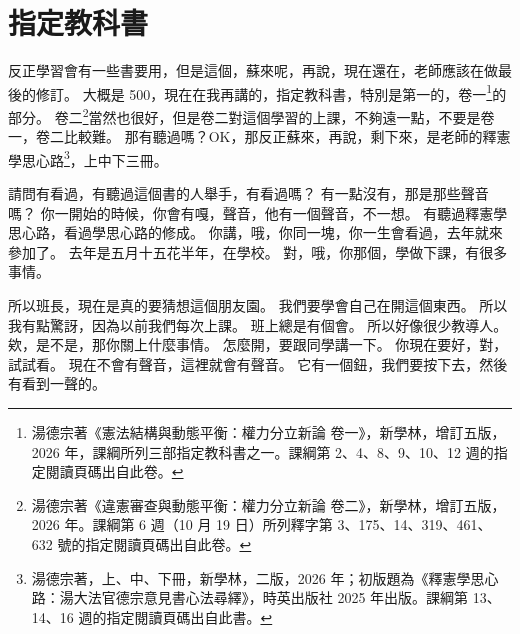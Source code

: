 \section{指定教科書}

\hypertarget{c01:cue:18}{}反正學習會有一些書要用，但是這個，蘇來呢，再說，現在還在，老師應該在做最後的修訂。
\hypertarget{c01:cue:19}{}大概是 500，現在在我再講的，指定教科書，特別是第一的，卷一\footnote{湯德宗著《憲法結構與動態平衡：權力分立新論 卷一》，新學林，增訂五版，2026 年，課綱所列三部指定教科書之一。課綱第 2、4、8、9、10、12 週的指定閱讀頁碼出自此卷。}的部分。
\hypertarget{c01:cue:20}{}卷二\footnote{湯德宗著《違憲審查與動態平衡：權力分立新論 卷二》，新學林，增訂五版，2026 年。課綱第 6 週（10 月 19 日）所列釋字第 3、175、14、319、461、632 號的指定閱讀頁碼出自此卷。}當然也很好，但是卷二對這個學習的上課，不夠遠一點，不要是卷一，卷二比較難。
\hypertarget{c01:cue:21}{}那有聽過嗎？OK，那反正蘇來，再說，剩下來，是老師的釋憲學思心路\footnote{湯德宗著，上、中、下冊，新學林，二版，2026 年；初版題為《釋憲學思心路：湯大法官德宗意見書心法尋繹》，時英出版社 2025 年出版。課綱第 13、14、16 週的指定閱讀頁碼出自此書。}，上中下三冊。

\hypertarget{c01:cue:22}{}請問有看過，有聽過這個書的人舉手，有看過嗎？
\hypertarget{c01:cue:23}{}有一點沒有，那是那些聲音嗎？
\hypertarget{c01:cue:24}{}你一開始的時候，你會有嘎，聲音，他有一個聲音，不一想。
\hypertarget{c01:cue:25}{}有聽過釋憲學思心路，看過學思心路的修成。
\hypertarget{c01:cue:26}{}你講，哦，你同一塊，你一生會看過，去年就來參加了。
\hypertarget{c01:cue:27}{}去年是五月十五花半年，在學校。
\hypertarget{c01:cue:28}{}對，哦，你那個，學做下課，有很多事情。

\hypertarget{c01:cue:29}{}所以班長，現在是真的要猜想這個朋友園。
\hypertarget{c01:cue:30}{}我們要學會自己在開這個東西。
\hypertarget{c01:cue:31}{}所以我有點驚訝，因為以前我們每次上課。
\hypertarget{c01:cue:32}{}班上總是有個會。
\hypertarget{c01:cue:33}{}所以好像很少教導人。
\hypertarget{c01:cue:34}{}欸，是不是，那你關上什麼事情。
\hypertarget{c01:cue:35}{}怎麼開，要跟同學講一下。
\hypertarget{c01:cue:36}{}你現在要好，對，試試看。
\hypertarget{c01:cue:37}{}現在不會有聲音，這裡就會有聲音。
\hypertarget{c01:cue:38}{}它有一個鈕，我們要按下去，然後有看到一聲的。

